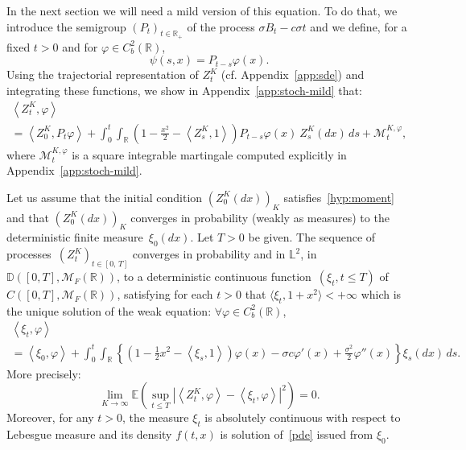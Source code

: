 \documentclass[AHL,Unicode,longabstracts,published]{cedram}
\newcommand{\Mo}{\mathcal{M}}
\newcommand*\D{\mathbb{D}}
\newcommand*\R{\mathbb{R}}
\newcommand*\E{\mathbb{E}}
\newcommand{\bbL}{\mathbb{L}}
\let\oldforall\forall
\renewcommand*{\forall}{\mathrel{\oldforall}}
\begin{document}
In the next section we will need a mild version of this equation. To do that, we introduce the semigroup $(P_{t})_{t \in \R_{+}}$ of the process $\sigma B_{t} - c \sigma t$ and we define, for a fixed $t>0$ and for $\varphi\in C^2_{b}(\R)$,
\begin{equation}\label{eq:semi-gp}
\psi(s,x) = P_{t-s}\varphi(x).
\end{equation}
Using the trajectorial representation of $Z^{K}_{t}$ (cf. Appendix~\ref{app:sde}) and integrating these functions, we show in Appendix~\ref{app:stoch-mild} that:
\begin{multline}\label{mild-proc}
\left\langle Z^{K}_{t},\varphi\right\rangle\\
=\left\langle Z^{K}_0,P_{t}\varphi\right\rangle+\int_{0}^{t} \int_{\R} \left(1-\frac{x^2}{2}-\left\langle Z^{K}_{s}, 1\right\rangle\right)P_{t-s}\varphi(x)\ Z^{K}_{s}(dx)\, ds+\Mo^{K, \varphi}_{t},
\end{multline}
where $\Mo^{K, \varphi}_{t}$ is a square integrable martingale computed explicitly in Appendix~\ref{app:stoch-mild}.

\begin{theo}\label{thm-CV}
Let us assume that the initial condition $(Z^K_0(dx))_{K}$ satisfies~\eqref{hyp:moment} and that $(Z^{K}_0(dx))_{K}$ converges in probability (weakly as measures) to the deterministic finite measure $\,\xi_0(dx)$. Let $T>0$ be given. The sequence of processes $\,(Z^{K}_{t})_{t \in [0,\,T]}$ converges in probability and in $\bbL^2$, in $\D([0,T],\Mo_{F}(\R))$, to a deterministic continuous function $\,(\xi_{t}, t\le T)$ of $C([0,T],\Mo_{F}(\R))$, satisfying for each $t>0$ that $\langle \xi_{t}, 1+x^2\rangle <+\infty$ which is the unique solution of the weak equation: $\forall \varphi\in C^2_{b}(\R)$,
\begin{multline}\label{limit-moving}
\left\langle \xi_{t},\varphi\right\rangle\\
=\left\langle \xi_{0},\varphi\right\rangle+\int_{0}^{t} \int_{\R} \left\{\left(1-\frac{1}{2}x^2-\left\langle \xi_{s}, 1\right\rangle\right)\varphi(x)-\sigma c \varphi'(x)+\frac{\sigma^2}{2}\varphi''(x)\right\} \xi_{s}(dx)\, ds.
\end{multline}
More precisely:
\begin{equation}\label{CV-L2}
\lim_{K \to \infty}\E\left(\sup_{t \le T} \left|\left\langle Z^{K}_{t},\varphi\right\rangle - \left\langle \xi_{t},\varphi\right\rangle\right|^2\right) = 0.
\end{equation}
Moreover, for any $t>0$, the measure $\xi_{t} $ is absolutely continuous with respect to Lebesgue measure and its density $f(t,x)$ is solution of~\eqref{pde} issued from $\xi_{0}$.
\end{theo}
\end{document}

